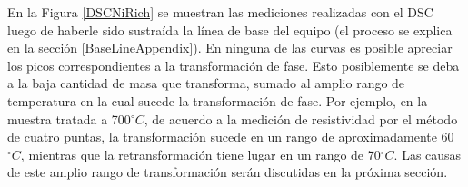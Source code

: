 \documentclass[12pt]{article}
\theoremstyle{definition}
\theoremstyle{remark}
\begin{document}
{En la Figura \ref{DSCNiRich} se muestran las mediciones realizadas con el DSC luego de haberle sido sustraída la línea de base del equipo (el proceso se explica en la sección \ref{BaseLineAppendix}). En ninguna de las curvas es posible apreciar los picos correspondientes a la transformación de fase. Esto posiblemente se deba a la baja cantidad de masa que transforma, sumado al amplio rango de temperatura en la cual sucede la transformación de fase. Por ejemplo, en la muestra tratada a 700$^\circ C$, de acuerdo a la medición de resistividad por el método de cuatro puntas, la transformación sucede en un rango de aproximadamente 60$^\circ C$, mientras que la retransformación tiene lugar en un rango de 70$^\circ C$. Las causas de este amplio rango de transformación serán discutidas en la próxima sección.

\begin{figure}[H]

\noindent{}\\
	

\end{figure}}
\end{document}
